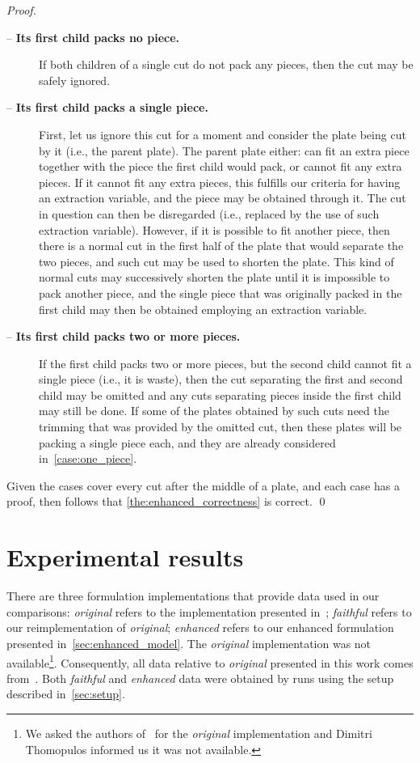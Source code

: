 \documentclass[smallextended]{svjour3}       %
\begin{document}
\begin{proof}
\begin{description}
\item[ -- \textbf{Its first child packs no piece.}]
If both children of a single cut do not pack any pieces, then the cut may be safely ignored.
\item[ -- \textbf{Its first child packs a single piece.}]
First, let us ignore this cut for a moment and consider the plate being cut by it (i.e., the parent plate).
The parent plate either: can fit an extra piece together with the piece the first child would pack, or cannot fit any extra pieces.
If it cannot fit any extra pieces, this fulfills our criteria for having an extraction variable, and the piece may be obtained through it.
The cut in question can then be disregarded (i.e., replaced by the use of such extraction variable).
However, if it is possible to fit another piece, then there is a normal cut in the first half of the plate that would separate the two pieces, and such cut may be used to shorten the plate.
This kind of normal cuts may successively shorten the plate until it is impossible to pack another piece, and the single piece that was originally packed in the first child may then be obtained employing an extraction variable.
\item[ -- \textbf{Its first child packs two or more pieces.}]
If the first child packs two or more pieces, but the second child cannot fit a single piece (i.e., it is waste), then the cut separating the first and second child may be omitted and any cuts separating pieces inside the first child may still be done.
If some of the plates obtained by such cuts need the trimming that was provided by the omitted cut, then these plates will be packing a single piece each, and they are already considered in~\cref{case:one_piece}.
\end{description}

Given the cases cover every cut after the middle of a plate, and each case has a proof, then follows that \autoref{the:enhanced_correctness} is correct. \qed

\end{proof}

\section{Experimental results}
\label{sec:experimental_results}

There are three formulation implementations that provide data used in our comparisons:
\emph{original} refers to the implementation presented in~\cite{furini:2016,dimitri_thesis};
\emph{faithful} refers to our reimplementation of \emph{original};
\emph{enhanced} refers to our enhanced formulation presented in~\autoref{sec:enhanced_model}.
The \emph{original} implementation was not available\footnote{
	We asked the authors of~\cite{furini:2016} for the \emph{original} implementation and Dimitri Thomopulos informed us it was not available.
}.
Consequently, all data relative to \emph{original} presented in this work comes from~\cite{dimitri_thesis}.
Both \emph{faithful} and \emph{enhanced} data were obtained by runs using the setup described in~\autoref{sec:setup}.
\end{document}
